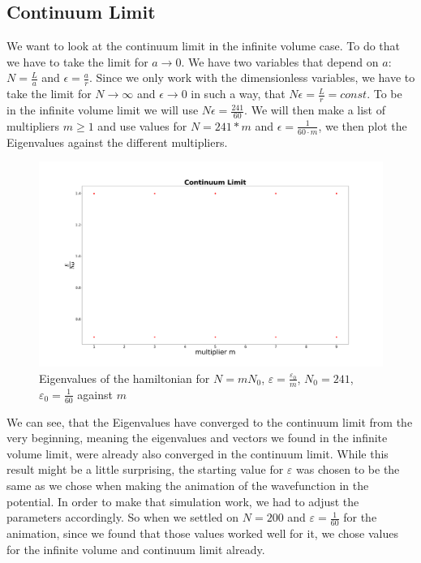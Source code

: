 \documentclass[11pt, letterpaper, onecolumn]{article}
\begin{document}
	\subsection{Continuum Limit}
    	We want to look at the continuum limit in the infinite volume case. To do that we have to take the limit for $a\rightarrow0$. We have two variables that depend on $a$: $N=\frac{L}{a}$ and $\epsilon=\frac{a}{r}$. Since we only work with the dimensionless variables, we have to take the limit for $N\rightarrow\infty$ and $\epsilon\rightarrow0$ in such a way, that $N\epsilon=\frac{L}{r}=const$. To be in the infinite volume limit we will use $N\epsilon=\frac{241}{60}$. We will then make a list of multipliers $m\geq1$ and use values for $N=241*m$ and $\epsilon=\frac{1}{60\cdot m}$, we then plot the Eigenvalues against the different multipliers.
	\begin{figure} [H] 
	\begin{center}
	\includegraphics[width=15cm]{"cont_lim_final.png"}
	\caption{Eigenvalues of the hamiltonian for $N=mN_0$, $\varepsilon=\frac{\varepsilon_0}{m}$, $N_0=241$, $\varepsilon_0=\frac{1}{60}$ against $m$}
	\end{center}
	\end{figure}
	We can see, that the Eigenvalues have converged to the continuum limit from the very beginning, meaning the eigenvalues and vectors we found in the infinite volume limit, were already also converged in the continuum limit. While this result might be a little surprising, the starting value for $\varepsilon$ was chosen to be the same as we chose when making the animation of the wavefunction in the potential. In order to make that simulation work, we had to adjust the parameters accordingly. So when we settled on $N=200$ and $\varepsilon=\frac{1}{60}$ for the animation, since we found that those values worked well for it, we chose values for the infinite volume and continuum limit already. 
\end{document}
